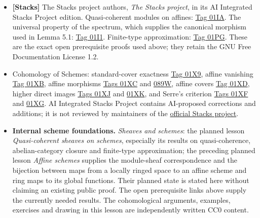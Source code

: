 \documentclass[11pt]{article}
\providecommand{\tightlist}{\setlength{\itemsep}{0pt}\setlength{\parskip}{0pt}}
\begin{document}
\begin{itemize}
\tightlist
\item
  \textbf{{[}Stacks{]}} The Stacks project authors, \emph{The Stacks
  project}, in its AI Integrated Stacks Project edition. Quasi-coherent
  modules on affines:
  \href{https://kokunoyumeto.github.io/stacks-zh-hans-cn/en/schemes.html\#schemes-lemma-quasi-coherent-affine}{Tag
  01IA}. The universal property of the spectrum, which supplies the
  canonical morphism used in Lemma 5.1:
  \href{https://kokunoyumeto.github.io/stacks-zh-hans-cn/en/schemes.html\#schemes-lemma-morphism-into-affine}{Tag
  01I1}. Finite-type approximation:
  \href{https://kokunoyumeto.github.io/stacks-zh-hans-cn/en/properties.html\#properties-lemma-quasi-coherent-colimit-finite-type}{Tag
  01PG}. These are the exact open prerequisite proofs used above; they
  retain the GNU Free Documentation License 1.2.
\item
  Cohomology of Schemes: standard-cover exactness
  \href{https://kokunoyumeto.github.io/stacks-zh-hans-cn/en/coherent.html\#coherent-lemma-cech-cohomology-quasi-coherent-trivial}{Tag
  01X9}, affine vanishing
  \href{https://kokunoyumeto.github.io/stacks-zh-hans-cn/en/coherent.html\#coherent-lemma-quasi-coherent-affine-cohomology-zero}{Tag
  01XB}, affine morphisms
  \href{https://kokunoyumeto.github.io/stacks-zh-hans-cn/en/coherent.html\#coherent-lemma-relative-affine-vanishing}{Tags
  01XC} and
  \href{https://kokunoyumeto.github.io/stacks-zh-hans-cn/en/coherent.html\#coherent-lemma-relative-affine-cohomology}{089W},
  affine covers
  \href{https://kokunoyumeto.github.io/stacks-zh-hans-cn/en/coherent.html\#coherent-lemma-cech-cohomology-quasi-coherent}{Tag
  01XD}, higher direct images
  \href{https://kokunoyumeto.github.io/stacks-zh-hans-cn/en/coherent.html\#coherent-lemma-quasi-coherence-higher-direct-images}{Tags
  01XJ} and
  \href{https://kokunoyumeto.github.io/stacks-zh-hans-cn/en/coherent.html\#coherent-lemma-quasi-coherence-higher-direct-images-application}{01XK},
  and Serre's criterion
  \href{https://kokunoyumeto.github.io/stacks-zh-hans-cn/en/coherent.html\#coherent-lemma-quasi-compact-h1-zero-covering}{Tags
  01XF} and
  \href{https://kokunoyumeto.github.io/stacks-zh-hans-cn/en/coherent.html\#coherent-lemma-quasi-separated-h1-zero-covering}{01XG}.
  AI Integrated Stacks Project contains AI-proposed corrections and
  additions; it is not reviewed by maintainers of the
  \href{https://stacks.math.columbia.edu/}{official Stacks project}.
\item
  \textbf{Internal scheme foundations.} \emph{Sheaves and schemes}: the
  planned lesson \emph{Quasi-coherent sheaves on schemes}, especially
  its results on quasi-coherence, abelian-category closure and
  finite-type approximation; the preceding planned lesson \emph{Affine
  schemes} supplies the module-sheaf correspondence and the bijection
  between maps from a locally ringed space to an affine scheme and ring
  maps to its global functions. Their planned state is stated here
  without claiming an existing public proof. The open prerequisite links
  above supply the currently needed results. The cohomological
  arguments, examples, exercises and drawing in this lesson are
  independently written CC0 content.
\end{itemize}
\end{document}
